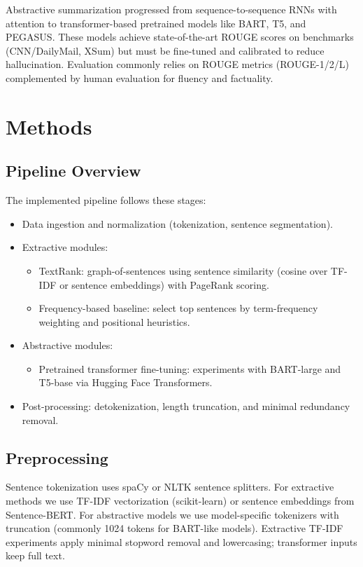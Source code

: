 \documentclass[11pt,a4paper]{article}
\begin{document}
Abstractive summarization progressed from sequence-to-sequence RNNs with attention to transformer-based pretrained models like BART, T5, and PEGASUS. These models achieve state-of-the-art ROUGE scores on benchmarks (CNN/DailyMail, XSum) but must be fine-tuned and calibrated to reduce hallucination. Evaluation commonly relies on ROUGE metrics (ROUGE-1/2/L) complemented by human evaluation for fluency and factuality.

\section{Methods}
\subsection{Pipeline Overview}
The implemented pipeline follows these stages:
\begin{itemize}
    \item Data ingestion and normalization (tokenization, sentence segmentation).
    \item Extractive modules:
    \begin{itemize}
        \item TextRank: graph-of-sentences using sentence similarity (cosine over TF-IDF or sentence embeddings) with PageRank scoring.
        \item Frequency-based baseline: select top sentences by term-frequency weighting and positional heuristics.
    \end{itemize}
    \item Abstractive modules:
    \begin{itemize}
        \item Pretrained transformer fine-tuning: experiments with BART-large and T5-base via Hugging Face Transformers.
    \end{itemize}
    \item Post-processing: detokenization, length truncation, and minimal redundancy removal.
\end{itemize}

\subsection{Preprocessing}
Sentence tokenization uses spaCy or NLTK sentence splitters. For extractive methods we use TF-IDF vectorization (scikit-learn) or sentence embeddings from Sentence-BERT. For abstractive models we use model-specific tokenizers with truncation (commonly 1024 tokens for BART-like models). Extractive TF-IDF experiments apply minimal stopword removal and lowercasing; transformer inputs keep full text.
\end{document}
